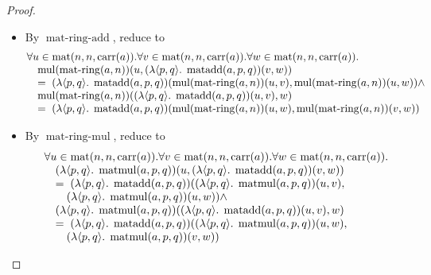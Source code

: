 \documentclass[11pt]{article}
\theoremstyle{plain}
\begin{document}
\begin{proof}
\begin{itemize}[leftmargin=2.8em, itemsep=4pt, parsep=1pt]
  \item[\textbf{110}] By $\operatorname{mat\text{-}ring\text{-}add}$, reduce to
\begin{equation*}
\begin{array}{@{}l@{}} \forall u \in \operatorname{mat}(n, n, \operatorname{carr}(a)). \forall v \in \operatorname{mat}(n, n, \operatorname{carr}(a)). \forall w \in \operatorname{mat}(n, n, \operatorname{carr}(a)). \\ \quad \operatorname{mul}(\operatorname{mat\text{-}ring}(a, n))(u, (\lambda \langle p, q \rangle.\; \operatorname{matadd}(a, p, q))(v, w)) \\ \quad =\; (\lambda \langle p, q \rangle.\; \operatorname{matadd}(a, p, q))(\operatorname{mul}(\operatorname{mat\text{-}ring}(a, n))(u, v), \operatorname{mul}(\operatorname{mat\text{-}ring}(a, n))(u, w)) \wedge \\ \quad \operatorname{mul}(\operatorname{mat\text{-}ring}(a, n))((\lambda \langle p, q \rangle.\; \operatorname{matadd}(a, p, q))(u, v), w) \\ \quad =\; (\lambda \langle p, q \rangle.\; \operatorname{matadd}(a, p, q))(\operatorname{mul}(\operatorname{mat\text{-}ring}(a, n))(u, w), \operatorname{mul}(\operatorname{mat\text{-}ring}(a, n))(v, w)) \end{array}
\end{equation*}

  \item[\textbf{111}] By $\operatorname{mat\text{-}ring\text{-}mul}$, reduce to
\begin{equation*}
\begin{array}{@{}l@{}} \forall u \in \operatorname{mat}(n, n, \operatorname{carr}(a)). \forall v \in \operatorname{mat}(n, n, \operatorname{carr}(a)). \forall w \in \operatorname{mat}(n, n, \operatorname{carr}(a)). \\ \quad (\lambda \langle p, q \rangle.\; \operatorname{matmul}(a, p, q))(u, (\lambda \langle p, q \rangle.\; \operatorname{matadd}(a, p, q))(v, w)) \\ \quad =\; (\lambda \langle p, q \rangle.\; \operatorname{matadd}(a, p, q))((\lambda \langle p, q \rangle.\; \operatorname{matmul}(a, p, q))(u, v), \\ \quad \quad (\lambda \langle p, q \rangle.\; \operatorname{matmul}(a, p, q))(u, w)) \wedge \\ \quad (\lambda \langle p, q \rangle.\; \operatorname{matmul}(a, p, q))((\lambda \langle p, q \rangle.\; \operatorname{matadd}(a, p, q))(u, v), w) \\ \quad =\; (\lambda \langle p, q \rangle.\; \operatorname{matadd}(a, p, q))((\lambda \langle p, q \rangle.\; \operatorname{matmul}(a, p, q))(u, w), \\ \quad \quad (\lambda \langle p, q \rangle.\; \operatorname{matmul}(a, p, q))(v, w)) \end{array}
\end{equation*}


\end{itemize}
\end{proof}
\end{document}
